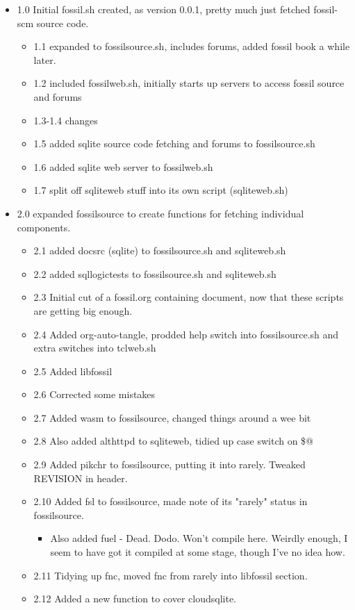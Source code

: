 \documentclass[11pt]{article}
\begin{document}
\begin{itemize}
\item 1.0 Initial fossil.sh created, as version 0.0.1, pretty much just fetched fossil-scm source
code.
\begin{itemize}
\item 1.1 expanded to fossilsource.sh, includes forums, added fossil book a while later.
\item 1.2 included fossilweb.sh, initially starts up servers to access fossil source and forums
\item 1.3-1.4 changes
\item 1.5 added sqlite source code fetching and forums to fossilsource.sh
\item 1.6 added sqlite web server to fossilweb.sh
\item 1.7 split off sqliteweb stuff into its own script (sqliteweb.sh)
\end{itemize}
\item 2.0 expanded fossilsource to create functions for fetching individual components.
\begin{itemize}
\item 2.1 added docsrc (sqlite) to fossilsource.sh and sqliteweb.sh
\item 2.2 added sqllogictests to fossilsource.sh and sqliteweb.sh

\item 2.3 Initial cut of a fossil.org containing document, now that these scripts are getting big
enough.
\item 2.4 Added org-auto-tangle, prodded help switch into fossilsource.sh and extra switches into
tclweb.sh
\item 2.5 Added libfossil
\item 2.6 Corrected some mistakes
\item 2.7 Added wasm to fossilsource, changed things around a wee bit
\item 2.8 Also added althttpd to sqliteweb, tidied up case switch on \$@
\item 2.9 Added pikchr to fossilsource, putting it into rarely. Tweaked REVISION in header.
\item 2.10 Added fsl to fossilsource, made note of its "rarely" status in fossilsource.  
\begin{itemize}
\item Also added fuel - Dead. Dodo. Won't compile here. Weirdly enough, I seem to have got it
compiled at some stage, though I've no idea how.
\end{itemize}
\item 2.11 Tidying up fnc, moved fnc from rarely into libfossil section.
\item 2.12 Added a new function to cover cloudsqlite.
\end{itemize}
\end{itemize}
\end{document}
